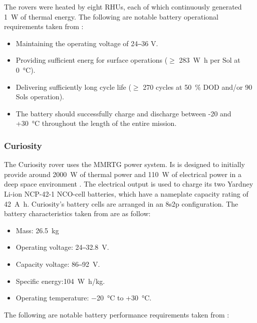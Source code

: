 The rovers were heated by eight \acp{RHU}, each of which continuously generated \SI{1}{\watt} of thermal energy. The following are notable battery operational requirements taken from :

\begin{itemize}
  \item Maintaining the operating voltage of 24‒36 \si{\volt}.
  \item Providing sufficient energ for surface operations ($\geq$ \SI{283}{\watt\hour} per Sol at \SI{0}{\celsius}).
  \item Delivering sufficiently long cycle life ($\geq$ 270 cycles at \SI{50}{\percent} \ac{DOD} and/or 90 Sols operation).
  \item The battery should successfully charge and discharge between -20 and +\SI{30}{\celsius} throughout the length of the entire mission.
\end{itemize}

\subsubsection{Curiosity}
The Curiosity rover uses the \ac{MMRTG} power system. Is is designed to initially provide around \SI{2000}{\watt} of thermal power and \SI{110}{\watt} of electrical power in a deep space environment . The electrical output is used to charge its two Yardney \ac{Li-ion} NCP-42-1 \ac{NCO}-cell batteries, which have a nameplate capacity rating of \SI{42}{\ampere\hour}. Curiosity's battery cells are arranged in an 8s2p configuration. The battery characteristics taken from  are as follow:

\begin{itemize}
   \item Mass: \SI{26.5}{\kilo\gram}
   \item Operating voltage: 24‒\SI{32.8}{\volt}.
   \item Capacity voltage: 86‒\SI{92}{\volt}.
   \item Specific energy:\SI{104}{\watt\hour/\kilo\gram}.
   \item Operating temperature: \SI{-20}{\celsius} to +\SI{30}{\celsius}.
\end{itemize}

The following are notable battery performance requirements taken from :

